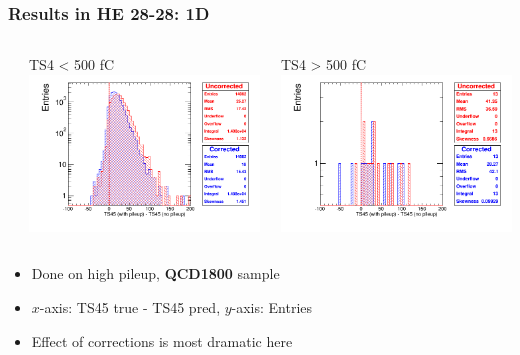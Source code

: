 \documentclass[bigger]{beamer}
\providecommand{\alert}[1]{\textbf{#1}}
\begin{document}
\begin{frame}
\frametitle{Results in HE 28-28: 1D}
\label{sec-3-3-24}
\begin{columns} %
\label{sec-3-3-24-1}
\begin{column}{0.55\textwidth}
\label{sec-3-3-24-1-1}

\centering
TS4 < 500 fC
\includegraphics[width=\textwidth]{fig/correction_comparison_1D_sample1800_under500_ring5.png}
\end{column}
\begin{column}{0.55\textwidth}
\label{sec-3-3-24-1-2}

\centering
TS4 > 500 fC
\includegraphics[width=\textwidth]{fig/correction_comparison_1D_sample1800_over500_ring5.png}
\end{column}
\end{columns}
\label{sec-3-3-24-2}
\begin{itemize}

\item Done on high pileup, \alert{QCD1800} sample
\label{sec-3-3-24-2-1}%

\item $x$-axis: TS45 true - TS45 pred, $y$-axis: Entries
\label{sec-3-3-24-2-2}%

\item Effect of corrections is most dramatic here
\label{sec-3-3-24-2-3}%
\end{itemize} %
\end{frame}
\end{document}
